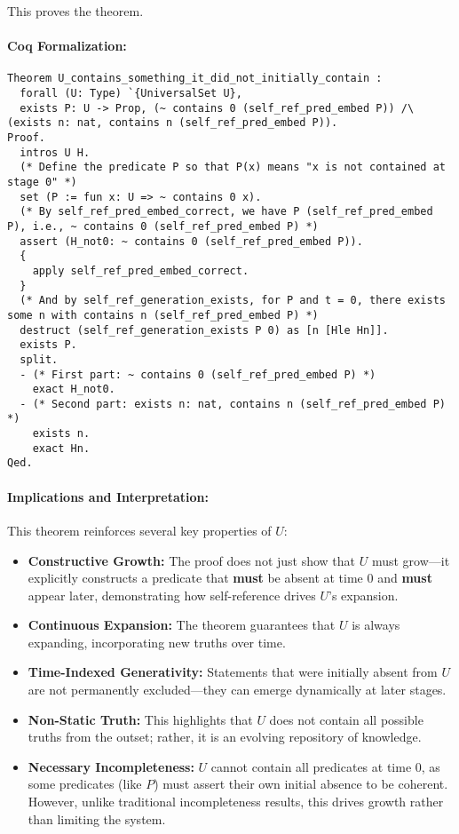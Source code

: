 \documentclass[12pt]{article}
\begin{document}
This proves the theorem.

\paragraph{Coq Formalization:}
\begin{lstlisting}[language=Coq]
Theorem U_contains_something_it_did_not_initially_contain :
  forall (U: Type) `{UniversalSet U},
  exists P: U -> Prop, (~ contains 0 (self_ref_pred_embed P)) /\ (exists n: nat, contains n (self_ref_pred_embed P)).
Proof.
  intros U H.
  (* Define the predicate P so that P(x) means "x is not contained at stage 0" *)
  set (P := fun x: U => ~ contains 0 x).
  (* By self_ref_pred_embed_correct, we have P (self_ref_pred_embed P), i.e., ~ contains 0 (self_ref_pred_embed P) *)
  assert (H_not0: ~ contains 0 (self_ref_pred_embed P)).
  {
    apply self_ref_pred_embed_correct.
  }
  (* And by self_ref_generation_exists, for P and t = 0, there exists some n with contains n (self_ref_pred_embed P) *)
  destruct (self_ref_generation_exists P 0) as [n [Hle Hn]].
  exists P.
  split.
  - (* First part: ~ contains 0 (self_ref_pred_embed P) *)
    exact H_not0.
  - (* Second part: exists n: nat, contains n (self_ref_pred_embed P) *)
    exists n.
    exact Hn.
Qed.
\end{lstlisting}

\paragraph{Implications and Interpretation:}
This theorem reinforces several key properties of \( U \):

\begin{itemize}
    \item \textbf{Constructive Growth:} The proof does not just show that \( U \) must grow—it explicitly constructs a predicate that \textbf{must} be absent at time \( 0 \) and \textbf{must} appear later, demonstrating how self-reference drives \( U \)'s expansion.
    \item \textbf{Continuous Expansion:} The theorem guarantees that \( U \) is always expanding, incorporating new truths over time.
    \item \textbf{Time-Indexed Generativity:} Statements that were initially absent from \( U \) are not permanently excluded—they can emerge dynamically at later stages.
    \item \textbf{Non-Static Truth:} This highlights that \( U \) does not contain all possible truths from the outset; rather, it is an evolving repository of knowledge.
    \item \textbf{Necessary Incompleteness:} \( U \) cannot contain all predicates at time \( 0 \), as some predicates (like \( P \)) must assert their own initial absence to be coherent. However, unlike traditional incompleteness results, this drives growth rather than limiting the system.
\end{itemize}
\end{document}
